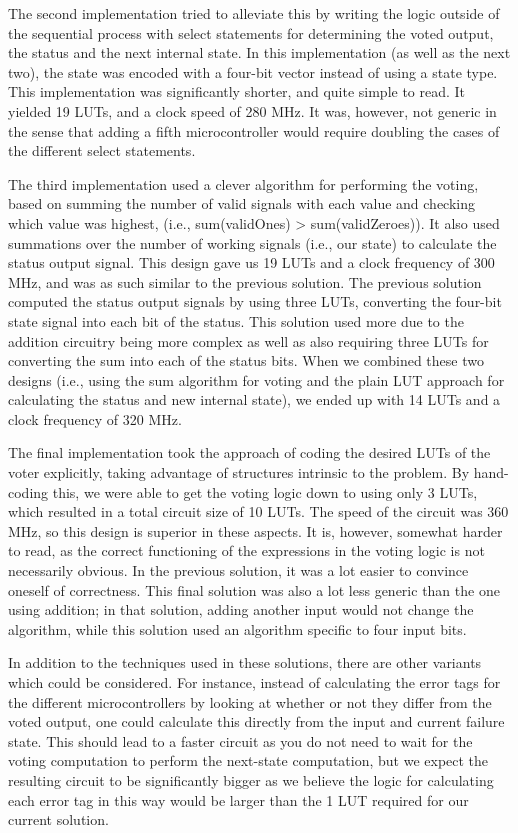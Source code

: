 \documentclass[11pt]{article}
\newcommand{\ie}{i.e.,\xspace}
\begin{document}
The second implementation tried to alleviate this by writing the logic
outside of the sequential process with select statements for
determining the voted output, the status and the next internal
state. In this implementation (as well as the next two), the state was
encoded with a four-bit vector instead of using a state type. This
implementation was significantly shorter, and quite simple to read. It
yielded 19 LUTs, and a clock speed of 280 MHz. It was, however, not
generic in the sense that adding a fifth microcontroller would require
doubling the cases of the different select statements. 

The third implementation used a clever algorithm for performing the
voting, based on summing the number of valid signals with each value
and checking which value was highest, (\ie sum(validOnes) \textgreater
sum(validZeroes)). It also used summations over the number of working
signals (\ie our state) to calculate the status output signal. This
design gave us 19 LUTs and a clock frequency of 300 MHz, and was as
such similar to the previous solution. The previous solution computed
the status output signals by using three LUTs, converting the four-bit
state signal into each bit of the status. This solution used more due
to the addition circuitry being more complex as well as also requiring
three LUTs for converting the sum into each of the status bits. When
we combined these two designs (\ie using the sum algorithm for voting
and the plain LUT approach for calculating the status and new internal
state), we ended up with 14 LUTs and a clock frequency of 320 MHz.

The final implementation took the approach of coding the desired LUTs
of the voter explicitly, taking advantage of structures intrinsic to
the problem. By hand-coding this, we were able to get the voting logic
down to using only 3 LUTs, which resulted in a total circuit size of
10 LUTs. The speed of the circuit was 360 MHz, so this design is
superior in these aspects. It is, however, somewhat harder to read, as
the correct functioning of the expressions in the voting logic is not
necessarily obvious. In the previous solution, it was a lot easier to
convince oneself of correctness. This final solution was also a lot
less generic than the one using addition; in that solution, adding
another input would not change the algorithm, while this solution used
an algorithm specific to four input bits. 

In addition to the techniques used in these solutions, there are other
variants which could be considered. For instance, instead of
calculating the error tags for the different microcontrollers by
looking at whether or not they differ from the voted output, one could
calculate this directly from the input and current failure state. This
should lead to a faster circuit as you do not need to wait for the
voting computation to perform the next-state computation, but we
expect the resulting circuit to be significantly bigger as we believe
the logic for calculating each error tag in this way would be larger
than the 1 LUT required for our current solution.
\end{document}
